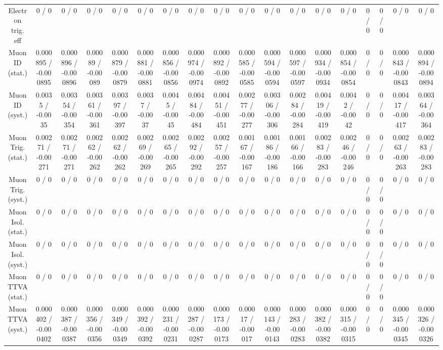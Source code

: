 \documentclass[10pt]{article}
\begin{document}
\begin{table}[htbp]
\begin{center}
\begin{tabular}{|c|c|c|c|c|c|c|c|c|c|c|c|c|c|c|c|c|c|}
  Electron trig. eff & 0 / 0 & 0 / 0 & 0 / 0 & 0 / 0 & 0 / 0 & 0 / 0 & 0 / 0 & 0 / 0 & 0 / 0 & 0 / 0 & 0 / 0 & 0 / 0 & 0 / 0 & 0 / 0 & 0 / 0 & 0 / 0 & 0 / 0 \\ 
  Muon ID (stat.) & 0.000895 / -0.000895 & 0.000896 / -0.000896 & 0.00089 / -0.00089 & 0.000879 / -0.000879 & 0.000881 / -0.000881 & 0.000856 / -0.000856 & 0.000974 / -0.000974 & 0.000892 / -0.000892 & 0.000585 / -0.000585 & 0.000594 / -0.000594 & 0.000597 / -0.000597 & 0.000934 / -0.000934 & 0.000854 / -0.000854 & 0 / 0 & 0 / 0 & 0.000843 / -0.000843 & 0.000894 / -0.000894 \\ 
  Muon ID (syst.) & 0.0035 / -0.0035 & 0.00354 / -0.00354 & 0.00361 / -0.00361 & 0.00397 / -0.00397 & 0.0037 / -0.0037 & 0.0045 / -0.0045 & 0.00484 / -0.00484 & 0.00451 / -0.00451 & 0.00277 / -0.00277 & 0.00306 / -0.00306 & 0.00284 / -0.00284 & 0.00419 / -0.00419 & 0.0042 / -0.0042 & 0 / 0 & 0 / 0 & 0.00417 / -0.00417 & 0.00364 / -0.00364 \\ 
  Muon Trig. (stat.) & 0.00271 / -0.00271 & 0.00271 / -0.00271 & 0.00262 / -0.00262 & 0.00262 / -0.00262 & 0.00269 / -0.00269 & 0.00265 / -0.00265 & 0.00292 / -0.00292 & 0.00257 / -0.00257 & 0.00167 / -0.00167 & 0.00186 / -0.00186 & 0.00166 / -0.00166 & 0.00283 / -0.00283 & 0.00246 / -0.00246 & 0 / 0 & 0 / 0 & 0.00263 / -0.00263 & 0.00283 / -0.00283 \\ 
  Muon Trig. (syst.) & 0 / 0 & 0 / 0 & 0 / 0 & 0 / 0 & 0 / 0 & 0 / 0 & 0 / 0 & 0 / 0 & 0 / 0 & 0 / 0 & 0 / 0 & 0 / 0 & 0 / 0 & 0 / 0 & 0 / 0 & 0 / 0 & 0 / 0 \\ 
  Muon Isol. (stat.) & 0 / 0 & 0 / 0 & 0 / 0 & 0 / 0 & 0 / 0 & 0 / 0 & 0 / 0 & 0 / 0 & 0 / 0 & 0 / 0 & 0 / 0 & 0 / 0 & 0 / 0 & 0 / 0 & 0 / 0 & 0 / 0 & 0 / 0 \\ 
  Muon Isol. (syst.) & 0 / 0 & 0 / 0 & 0 / 0 & 0 / 0 & 0 / 0 & 0 / 0 & 0 / 0 & 0 / 0 & 0 / 0 & 0 / 0 & 0 / 0 & 0 / 0 & 0 / 0 & 0 / 0 & 0 / 0 & 0 / 0 & 0 / 0 \\ 
  Muon TTVA (stat.) & 0 / 0 & 0 / 0 & 0 / 0 & 0 / 0 & 0 / 0 & 0 / 0 & 0 / 0 & 0 / 0 & 0 / 0 & 0 / 0 & 0 / 0 & 0 / 0 & 0 / 0 & 0 / 0 & 0 / 0 & 0 / 0 & 0 / 0 \\ 
  Muon TTVA (syst.) & 0.000402 / -0.000402 & 0.000387 / -0.000387 & 0.000356 / -0.000356 & 0.000349 / -0.000349 & 0.000392 / -0.000392 & 0.000231 / -0.000231 & 0.000287 / -0.000287 & 0.000173 / -0.000173 & 0.00017 / -0.00017 & 0.000143 / -0.000143 & 0.000283 / -0.000283 & 0.000382 / -0.000382 & 0.000315 / -0.000315 & 0 / 0 & 0 / 0 & 0.000345 / -0.000345 & 0.000326 / -0.000326 \\ 

\end{tabular}
\end{center}
\end{table}
\end{document}
